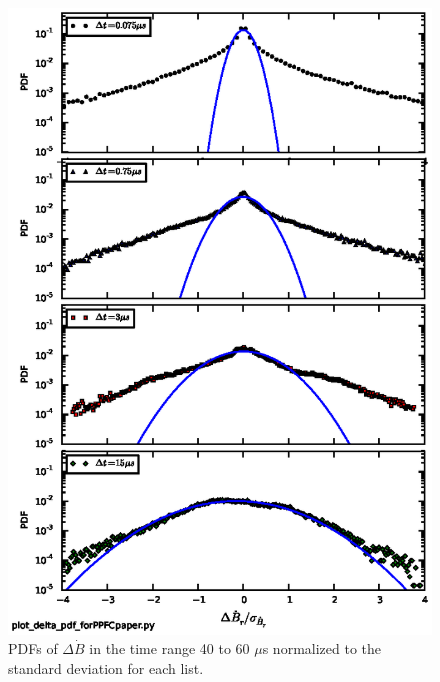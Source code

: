 \documentclass[12pt]{iopart}
\begin{document}
\begin{figure}[!htbp]
\centerline{
\includegraphics[width=15cm]{pdfs.eps}}
\caption{\label{fig:pdfs} PDFs of $\Delta \dot{B}$ in the time range 40 to 60 $\mu$s normalized to the standard deviation for each list.}
\end{figure}
\end{document}
